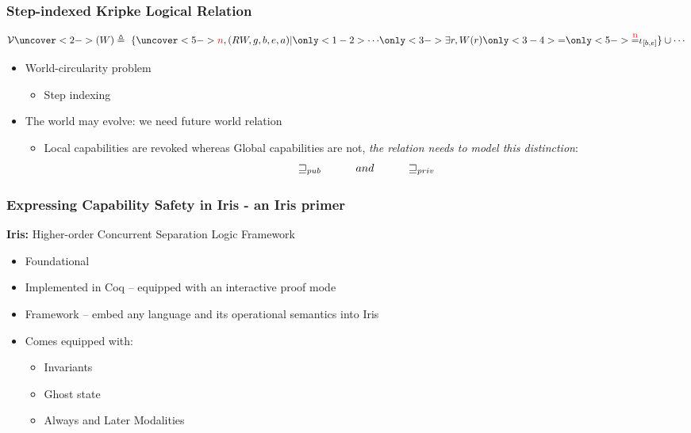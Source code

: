 \documentclass{beamer}
\newcommand\myeq[1]{\stackrel{\mathclap{\normalfont\mbox{#1}}}{=}}
\begin{document}
\begin{frame}
\frametitle{Step-indexed Kripke Logical Relation}
 
$$ \mathcal{V}\uncover<2->{(W)}\triangleq~\{\uncover<5->{{\color{red}n}}, (RW, g, b, e, a) | \only<1-2>{\cdots} \only<3->{\exists r, W(r) \only<3-4>{=} \only<5->{\myeq{\small {\color{red} n}}} \iota_{[b,e]}} \} \cup \cdots $$
 
 \begin{itemize}
 	\item<4-> World-circularity problem
 		\begin{itemize}
 			\item<5-> {\color{red} Step indexing}
 		\end{itemize}
 	\item<6-> The world may evolve: we need future world relation
 		\begin{itemize}
 			\item<7-> Local capabilities are revoked whereas Global capabilities are not, \textit{the relation needs to model this distinction}:
 			$$ \sqsupseteq_{pub} \hspace{1 cm} and \hspace{1 cm} \sqsupseteq_{priv} $$
 		\end{itemize}
 \end{itemize}

\end{frame}

\begin{frame}
\frametitle{Expressing Capability Safety in Iris - an Iris primer}

\textbf{Iris:} Higher-order Concurrent Separation Logic Framework
\begin{itemize}
	\item<2-> Foundational
	\item<3-> Implemented in Coq -- equipped with an interactive proof mode
	\item<4-> Framework -- embed any language and its operational semantics into Iris
	\item<5-> Comes equipped with: 
		\begin{itemize}
			\item<5-> Invariants
			\item<6-> Ghost state
			\item<7-> Always and Later Modalities
		\end{itemize}
\end{itemize}


\end{frame}
\end{document}
